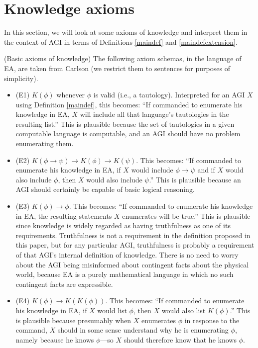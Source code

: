 \documentclass[runningheads]{llncs}
\begin{document}
\section{Knowledge axioms}
\label{appsection}

In this section, we will look at some axioms of knowledge and interpret them in the
context of AGI in terms of Definitions \ref{maindef} and \ref{maindefextension}.

\begin{example}
  (Basic axioms of knowledge) The following axiom schemas, in the language
  of EA, are taken from Carlson \cite{carlson}
  (we restrict them to sentences for purposes of simplicity).
  \begin{itemize}
    \item (E1) $K(\phi)$ whenever $\phi$ is valid (i.e., a tautology).
    Interpreted for an AGI $X$ using Definition \ref{maindef}, this becomes:
    ``If commanded to enumerate his knowledge in EA, $X$ will include
    all that language's tautologies in the resulting list.'' This is plausible
    because the set of tautologies in a given computable language is computable,
    and an AGI should have no problem enumerating them.
    \item (E2) $K(\phi\rightarrow\psi)\rightarrow K(\phi)\rightarrow K(\psi)$.
    This becomes: ``If commanded to enumerate his knowledge in EA,
    if $X$ would include $\phi\rightarrow\psi$ and if $X$ would also include
    $\phi$, then $X$ would also include $\psi$.'' This is plausible because
    an AGI should certainly be capable of basic logical reasoning.
    \item (E3) $K(\phi)\rightarrow\phi$. This becomes: ``If commanded to enumerate
    his knowledge in EA, the resulting statements $X$ enumerates
    will be true.'' This is plausible since knowledge is widely regarded as
    having truthfulness as one of its requirements. Truthfulness is not a
    requirement in the definition proposed in this paper, but for any particular
    AGI, truthfulness is probably a requirement of that AGI's internal definition
    of knowledge. There is no need to worry about the AGI being misinformed about
    contingent facts about the physical world, because EA is a purely mathematical
    language in which no such contingent facts are expressible.
    \item (E4) $K(\phi)\rightarrow K(K(\phi))$. This becomes: ``If commanded to
    enumerate his knowledge in EA, if $X$ would list $\phi$,
    then $X$ would also list $K(\phi)$.'' This is plausible because presumably
    when $X$ enumerates $\phi$ in response to the command, $X$ should in some sense
    understand why he is enumerating $\phi$, namely because he knows $\phi$---so $X$
    should therefore know that he knows $\phi$.
  \end{itemize}
\end{example}
\end{document}
